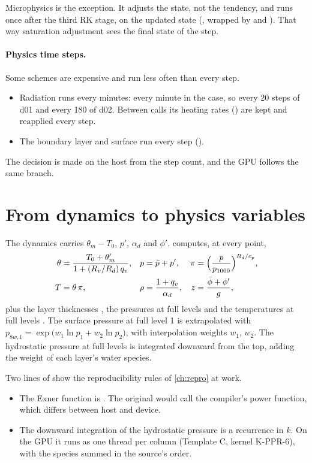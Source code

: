 Microphysics is the exception. It adjusts the state, not the tendency, and runs once after the third RK stage, on the
updated state (, wrapped by  and ).
That way saturation adjustment sees the final state of the step.

\paragraph{Physics time steps.} Some schemes are expensive and run less often than every step.
\begin{itemize}
  \item Radiation runs every  minutes: every minute in the case, so every 20 steps of d01 and every 180 of
    d02. Between calls its heating rates () are kept and reapplied every step.
  \item The boundary layer and surface run every step ().
\end{itemize}
The decision is made on the host from the step count, and the GPU follows the same branch.

\section{From dynamics to physics variables}

The dynamics carries $\theta_m - T_0$, $p'$, $\alpha_d$ and $\phi'$. 
computes, at every point,
\begin{align}
  \theta &= \frac{T_0 + \theta'_m}{1 + (R_v/R_d)\,q_v}, & p &= \bar p + p', &
  \pi &= \Bigl(\frac{p}{p_{1000}}\Bigr)^{R_d/c_p}, \\
  T &= \theta\,\pi, & \rho &= \frac{1 + q_v}{\alpha_d}, &
  z &= \frac{\bar\phi + \phi'}{g},
\end{align}
plus the layer thicknesses , the pressures at full levels  and the temperatures at full levels
. The surface pressure at full level 1 is extrapolated with
$p_{8w,1} = \exp\bigl(w_1 \ln p_1 + w_2 \ln p_2\bigr)$, with interpolation weights $w_1$, $w_2$. The hydrostatic
pressure at full levels is integrated downward from the top, adding the weight of each layer's water species.

\begin{portnote}
Two lines of  show the reproducibility rules of \cref{ch:repro} at work.
\begin{itemize}
  \item The Exner function is . The original  would call the
    compiler's power function, which differs between host and device.
  \item The downward integration of the hydrostatic pressure is a recurrence in $k$. On the GPU it runs as one thread
    per column (Template C, kernel K-PPR-6), with the species summed in the source's order.
\end{itemize}
\end{portnote}

